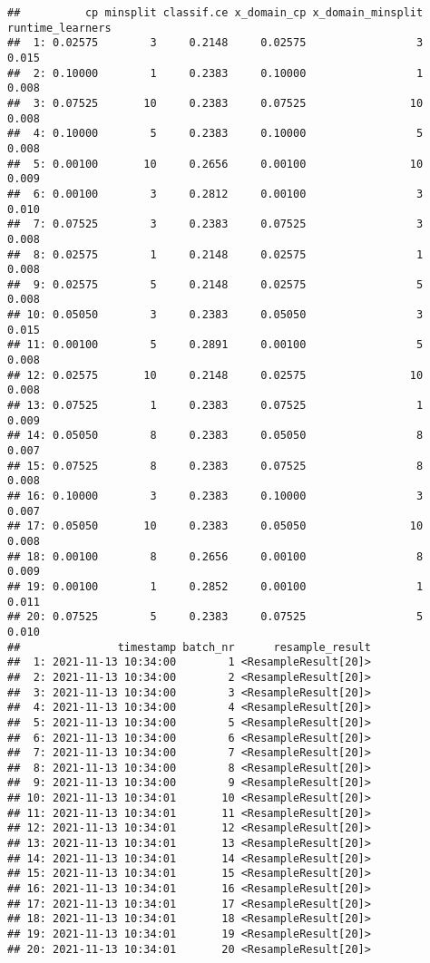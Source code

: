 \documentclass[
]{scrbook}
\begin{document}
\begin{verbatim}
##          cp minsplit classif.ce x_domain_cp x_domain_minsplit runtime_learners
##  1: 0.02575        3     0.2148     0.02575                 3            0.015
##  2: 0.10000        1     0.2383     0.10000                 1            0.008
##  3: 0.07525       10     0.2383     0.07525                10            0.008
##  4: 0.10000        5     0.2383     0.10000                 5            0.008
##  5: 0.00100       10     0.2656     0.00100                10            0.009
##  6: 0.00100        3     0.2812     0.00100                 3            0.010
##  7: 0.07525        3     0.2383     0.07525                 3            0.008
##  8: 0.02575        1     0.2148     0.02575                 1            0.008
##  9: 0.02575        5     0.2148     0.02575                 5            0.008
## 10: 0.05050        3     0.2383     0.05050                 3            0.015
## 11: 0.00100        5     0.2891     0.00100                 5            0.008
## 12: 0.02575       10     0.2148     0.02575                10            0.008
## 13: 0.07525        1     0.2383     0.07525                 1            0.009
## 14: 0.05050        8     0.2383     0.05050                 8            0.007
## 15: 0.07525        8     0.2383     0.07525                 8            0.008
## 16: 0.10000        3     0.2383     0.10000                 3            0.007
## 17: 0.05050       10     0.2383     0.05050                10            0.008
## 18: 0.00100        8     0.2656     0.00100                 8            0.009
## 19: 0.00100        1     0.2852     0.00100                 1            0.011
## 20: 0.07525        5     0.2383     0.07525                 5            0.010
##               timestamp batch_nr      resample_result
##  1: 2021-11-13 10:34:00        1 <ResampleResult[20]>
##  2: 2021-11-13 10:34:00        2 <ResampleResult[20]>
##  3: 2021-11-13 10:34:00        3 <ResampleResult[20]>
##  4: 2021-11-13 10:34:00        4 <ResampleResult[20]>
##  5: 2021-11-13 10:34:00        5 <ResampleResult[20]>
##  6: 2021-11-13 10:34:00        6 <ResampleResult[20]>
##  7: 2021-11-13 10:34:00        7 <ResampleResult[20]>
##  8: 2021-11-13 10:34:00        8 <ResampleResult[20]>
##  9: 2021-11-13 10:34:00        9 <ResampleResult[20]>
## 10: 2021-11-13 10:34:01       10 <ResampleResult[20]>
## 11: 2021-11-13 10:34:01       11 <ResampleResult[20]>
## 12: 2021-11-13 10:34:01       12 <ResampleResult[20]>
## 13: 2021-11-13 10:34:01       13 <ResampleResult[20]>
## 14: 2021-11-13 10:34:01       14 <ResampleResult[20]>
## 15: 2021-11-13 10:34:01       15 <ResampleResult[20]>
## 16: 2021-11-13 10:34:01       16 <ResampleResult[20]>
## 17: 2021-11-13 10:34:01       17 <ResampleResult[20]>
## 18: 2021-11-13 10:34:01       18 <ResampleResult[20]>
## 19: 2021-11-13 10:34:01       19 <ResampleResult[20]>
## 20: 2021-11-13 10:34:01       20 <ResampleResult[20]>
\end{verbatim}
\end{document}
